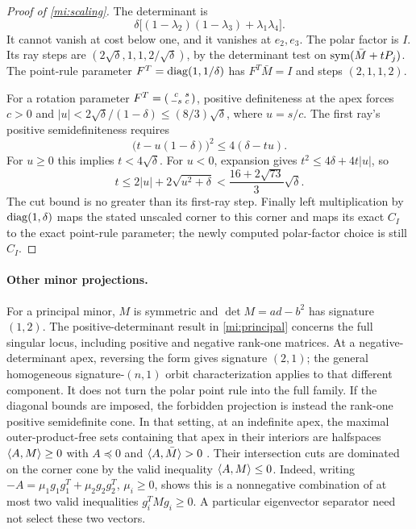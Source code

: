 \begin{proof}[Proof of \cref{mi:scaling}]\label{mi:scaling-proof}
The determinant is
\[
 \delta\bigl[(1-\lambda_2)(1-\lambda_3)+\lambda_1\lambda_4\bigr].
\]
It cannot vanish at cost below one, and it vanishes at $e_2,e_3$.
The polar factor is $I$. Its ray steps are
$(2\sqrt\delta,1,1,2/\sqrt\delta)$, by the determinant test on
$\operatorname{sym}(\bar M+tP_j)$. The point-rule parameter
$F^T=\operatorname{diag}(1,1/\delta)$ has $F^T\bar M=I$ and steps $(2,1,1,2)$.

For a rotation parameter
$F^T=\begin{psmallmatrix}c&s\\-s&c\end{psmallmatrix}$,
positive definiteness at the apex forces $c>0$ and
$|u|<2\sqrt\delta/(1-\delta)\le(8/3)\sqrt\delta$, where $u=s/c$.
The first ray's positive semidefiniteness requires
\[
 \bigl(t-u(1-\delta)\bigr)^2\le4(\delta-tu).
\]
For $u\ge0$ this implies $t<4\sqrt\delta$.
For $u<0$, expansion gives $t^2\le4\delta+4t|u|$, so
\[
 t\le2|u|+2\sqrt{u^2+\delta}
 <\frac{16+2\sqrt{73}}3\sqrt\delta.
\]
The cut bound is no greater than its first-ray step. Finally left
multiplication by $\operatorname{diag}(1,\delta)$ maps the stated unscaled corner to
this corner and maps its exact $C_I$ to the exact point-rule parameter;
the newly computed polar-factor choice is still $C_I$.
\end{proof}

\paragraph{Other minor projections.}\label{mi:other-minors}
For a principal minor, $M$ is symmetric and $\det M=ad-b^2$ has signature
$(1,2)$. The positive-determinant result in \cref{mi:principal} concerns
the full singular locus, including positive and negative rank-one matrices.
At a negative-determinant apex, reversing the form gives signature $(2,1)$;
the general homogeneous signature-$(n,1)$ orbit characterization applies
to that different component. It does not turn the polar point rule into
the full family. If the diagonal bounds are imposed, the forbidden
projection is instead the rank-one positive semidefinite cone. In that
setting, at an indefinite apex, the maximal outer-product-free sets
containing that apex in their interiors are halfspaces $\langle A,M\rangle\ge0$ with
$A\preceq0$ and $\langle A,\bar M\rangle>0$ \citep{BCM2020}.
Their intersection cuts are dominated on the corner cone by the valid
inequality $\langle A,M\rangle\le0$. Indeed, writing
$-A=\mu_1g_1g_1^T+\mu_2g_2g_2^T$, $\mu_i\ge0$, shows this is a
nonnegative combination of at most two valid inequalities
$g_i^TMg_i\ge0$. A particular eigenvector separator need not select
these two vectors.

